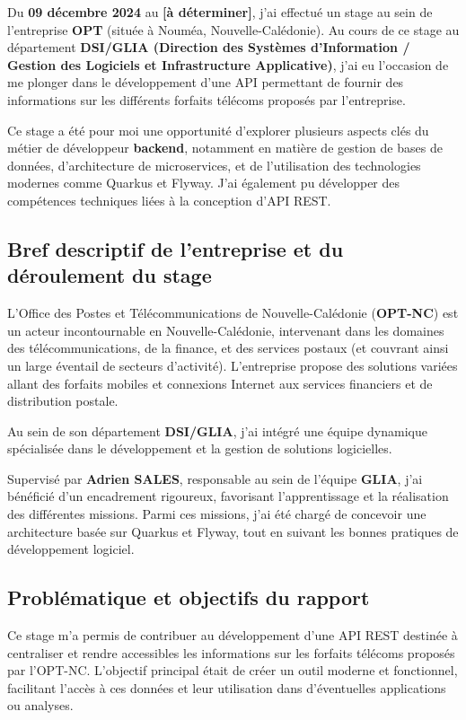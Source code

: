 \documentclass{article}
\begin{document}
	Du \textbf{09 décembre 2024} au \textbf{[à déterminer]}, j’ai effectué un stage au sein de l’entreprise \textbf{OPT} (située à Nouméa, Nouvelle-Calédonie). Au cours de ce stage au département \textbf{DSI/GLIA (Direction des Systèmes d'Information / Gestion des Logiciels et Infrastructure Applicative)}, j’ai eu l’occasion de me plonger dans le développement d’une API permettant de fournir des informations sur les différents forfaits télécoms proposés par l’entreprise.
	
	Ce stage a été pour moi une opportunité d’explorer plusieurs aspects clés du métier de développeur \textbf{backend}, notamment en matière de gestion de bases de données, d’architecture de microservices, et de l’utilisation des technologies modernes comme Quarkus et Flyway. J’ai également pu développer des compétences techniques liées à la conception d’API REST.
	
	\subsection{Bref descriptif de l’entreprise et du déroulement du stage}
	
	L’Office des Postes et Télécommunications de Nouvelle-Calédonie (\textbf{OPT-NC}) est un acteur incontournable en Nouvelle-Calédonie, intervenant dans les domaines des télécommunications, de la finance, et des services postaux (et couvrant ainsi un large éventail de secteurs d'activité). L’entreprise propose des solutions variées allant des forfaits mobiles et connexions Internet aux services financiers et de distribution postale.
	
	Au sein de son département \textbf{DSI/GLIA}, j’ai intégré une équipe dynamique spécialisée dans le développement et la gestion de solutions logicielles.
	
	
	Supervisé par \textbf{Adrien SALES}, responsable au sein de l’équipe \textbf{GLIA}, j’ai bénéficié d’un encadrement rigoureux, favorisant l’apprentissage et la réalisation des différentes missions. Parmi ces missions, j’ai été chargé de concevoir une architecture basée sur Quarkus et Flyway, tout en suivant les bonnes pratiques de développement logiciel.
	
	\subsection{Problématique et objectifs du rapport}
	
	Ce stage m’a permis de contribuer au développement d’une API REST destinée à centraliser et rendre accessibles les informations sur les forfaits télécoms proposés par l’OPT-NC. L’objectif principal était de créer un outil moderne et fonctionnel, facilitant l’accès à ces données et leur utilisation dans d’éventuelles applications ou analyses.
	
\end{document}
